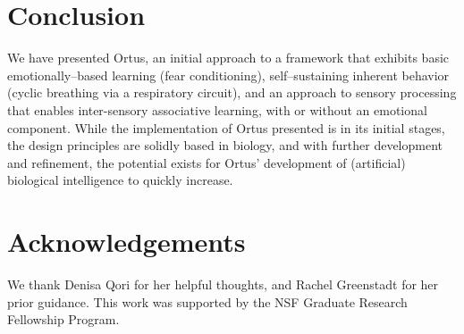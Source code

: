 \documentclass[letterpaper]{article}
\begin{document}
\section{Conclusion}
We have presented Ortus, an initial approach to a framework that exhibits basic emotionally--based learning (fear conditioning), self--sustaining inherent behavior (cyclic breathing via a respiratory circuit), and an approach to sensory processing that enables inter-sensory associative learning, with or without an emotional component. While the implementation of Ortus presented is in its initial stages, the design principles are solidly based in biology, and with further development and refinement, the potential exists for Ortus' development of (artificial) biological intelligence to quickly increase. %


\section{Acknowledgements}

We thank Denisa Qori for her helpful thoughts, and Rachel Greenstadt for her prior guidance.
This work was supported by the NSF Graduate Research Fellowship Program. 

\footnotesize

\end{document}
